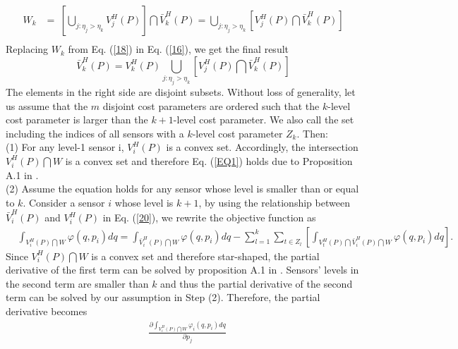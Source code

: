 \documentclass[journal,draftcls,onecolumn,12pt,twoside, narroweqnarray]{IEEEtran}
\begin{document}
\begin{IEEEproof}
\begin{equation}
\label{18}
\begin{aligned}
W_k&{=}\:\left[\bigcup_{j:\eta_j>\eta_k}V^H_j(P)\right]\bigcap\bar{V}^H_k(P) = \bigcup_{j:\eta_j>\eta_k}\left[V^H_j(P)\bigcap\bar{V}^H_k(P)\right]\\
\end{aligned}
\end{equation}
Replacing $W_k$ from Eq. (\ref{18}) in Eq. (\ref{16}), we get the final result
\begin{equation}
\label{20}
\bar{V}^H_k(P)=V^H_k(P)\bigcup_{j:\eta_j>\eta_k}\left[V^H_j(P)\bigcap\bar{V}^H_k(P)\right]
\end{equation}
The elements in the right side are disjoint subsets.
Without loss of generality, let us assume that the $m$ disjoint cost parameters are ordered such that the $k$-level cost parameter is larger than the $k+1$-level cost parameter. We also call the set including the indices of all sensors with a $k$-level cost parameter $Z_k$. Then:  \\
(1) For any level-1 sensor i, $V^H_i(P)$ is a convex set. Accordingly, the intersection $V^H_i(P)\bigcap W$ is a convex set and therefore Eq. (\ref{EQ1}) holds due to Proposition A.1 in \cite{SD}.\\
(2) Assume the equation holds for any sensor whose level is smaller than or equal to $k$. Consider a sensor $i$ whose level is $k+1$, by using the relationship between $\bar{V}^H_i(P)$ and $V^H_i(P)$ in Eq. (\ref{20}), we rewrite the objective function as
\begin{equation}
\begin{aligned}
\label{27}
&\int_{V^H_i(P)\bigcap W}\varphi(q,p_i)dq = \int_{\bar{V}^H_i(P)\bigcap W}\varphi(q,p_i)dq - \sum_{l=1}^{k}\sum_{t\in Z_l}\left[\int_{V^H_t(P)\bigcap\bar{V}^H_i(P)\bigcap W}\varphi(q,p_i)dq\right].
\end{aligned}
\end{equation}
Since $V^H_i(P)\bigcap W$ is a convex set and therefore star-shaped, the partial derivative of the first term can be solved by proposition A.1 in \cite{SD}. Sensors' levels in the second term are smaller than $k$ and thus the partial derivative of the second term can be solved by our assumption in Step (2). Therefore, the partial derivative becomes
\begin{equation}
\label{EQ28}
\begin{aligned}
&\frac{\partial \int_{V^H_i(P)\bigcap W}\varphi_i(q,p_i)dq}{\partial p_j}\\

\end{aligned}
\end{equation}
\end{IEEEproof}
\end{document}
